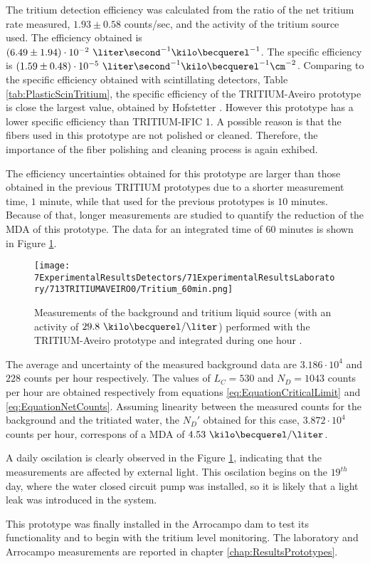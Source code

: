 The tritium detection efficiency was calculated from the ratio of the net tritium rate measured, $1.93 \pm 0.58$ counts/sec, and the activity of the tritium source used. The efficiency obtained is $(6.49 \pm 1.94)\cdot{} 10^{-2}~\liter\second^{-1}\kilo\becquerel^{-1}$.  The specific efficiency is $(1.59 \pm 0.48)\cdot{} 10^{-5}~\liter\second^{-1}\kilo\becquerel^{-1}\cm^{-2}$. Comparing to the specific efficiency obtained with scintillating detectors, Table \ref{tab:PlasticScinTritium}, the specific efficiency of the TRITIUM-Aveiro prototype is close the largest value, obtained by Hofstetter \cite{Hofstetter1, Hofstetter2}. However this prototype has a lower specific efficiency than TRITIUM-IFIC 1. A possible reason is that the fibers used in this prototype are not polished or cleaned. Therefore, the importance of the fiber polishing and cleaning process is again exhibed.

The efficiency uncertainties obtained for this prototype are larger than those obtained in the previous TRITIUM prototypes due to a shorter measurement time, $1$ minute, while that used for the previous prototypes is $10$ minutes. Because of that, longer measurements are studied to quantify the reduction of the MDA of this prototype. The data for an integrated time of $60$ minutes is shown in Figure \ref{fig:Tritium60min}.

\begin{figure}[h]
\centering
\texttt{[image: 7ExperimentalResultsDetectors/71ExperimentalResultsLaboratory/713TRITIUMAVEIRO0/Tritium\_60min.png]}
\caption{Measurements of the background and tritium liquid source (with an activity of $29.8~\kilo\becquerel/\liter$) performed with the TRITIUM-Aveiro prototype and integrated during one hour \cite{ExperimentalPaperCarlos}.\label{fig:Tritium60min}}
\end{figure}

The average and uncertainty of the measured background data are $3.186 \cdot{} 10^{4}$ and $228$ counts per hour respectively. The values of $L_C=530$ and $N_D=1043$ counts per hour are obtained respectively from equations \ref{eq:EquationCriticalLimit} and \ref{eq:EquationNetCounts}. Assuming linearity between the measured counts for the background and the tritiated water, the $N_D'$ obtained for this case, $3.872\cdot{}10^4$ counts per hour,  correspons of a MDA of $4.53~\kilo\becquerel/\liter$.

A daily oscilation is clearly observed in the Figure \ref{fig:Tritium60min}, indicating that the measurements are affected by external light. This oscilation begins on the $19^{th}$ day, where the water closed circuit pump was installed, so it is likely that a light leak was introduced in the system.

This prototype was finally installed in the Arrocampo dam to test its functionality and to begin with the tritium level monitoring. The laboratory and Arrocampo measurements are reported in chapter \ref{chap:ResultsPrototypes}.
